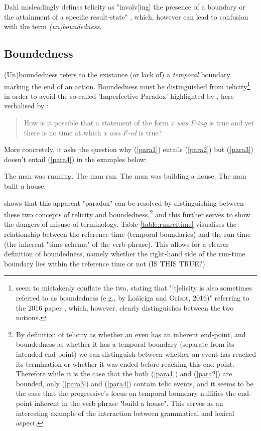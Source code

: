 Dahl misleadingly defines telicity as "involv[ing] the presence of a boundary or the attainment of a specific result-state" \citep{DAHL2015210}, which, however can lead to confusion with the term \emph{(un)boundedness}.
\subsection*{Boundedness}
(Un)boundedness refers to the existance (or lack of) a \emph{temporal} boundary marking the end of an action. Boundedness must be distinguished from telicity\footnote{\citet{friedrich-etal-2023-kind} seem to mistakenly conflate the two, stating that "[t]elicity is also sometimes referred to as boundedness (e.g., by Loáiciga and Grisot, 2016)" referring to the 2016 paper \citet{loaiciga-grisot-2016-predicting}, which, however, clearly distinguishes between the two notions.} in order to avoid the so-called 'Imperfective Paradox' highlighted by \citet{Linguistics2005DowtyD1}, here verbalised by \citet{zucchi}:

\begin{quotation}
    How is it possible that a statement of the form \emph{x was F-ing} is true and yet there
    is no time at which \emph{x was F-ed} is true?
\end{quotation}
More concretely, it asks the question why (\ref{para1}) entails (\ref{para2}) but (\ref{para3}) doesn't entail (\ref{para4}) in the examples below:
\begin{exe}
    \ex The man was running.
    \label{para1}
    \ex The man ran.
    \label{para2}
    \ex The man was building a house.
    \label{para3}
    \ex The man built a house.
    \label{para4}
\end{exe}
\citet{6608d9d0-a477-39af-8491-2172df5ae612} shows that this apparent "paradox" can be resolved by distinguishing between these two concepts of telicity and boundedness,\footnote{By definition of telicity as whether an even has an inherent end-point, and boundedness as whether it has a temporal boundary (separate from its intended end-point) we can distinguish between whether an event has reached its termination or whether it was ended before reaching this end-point. Therefore while it is the case that the both (\ref{para1}) and (\ref{para2}) are bounded, only (\ref{para3}) and (\ref{para4}) contain telic events, and it seems to be the case that the progressive's focus on temporal boundary nullifies the end-point inherent in the verb phrase "build a house". This serves as an interesting example of the interaction between grammatical and lexical aspect.} and this further serves to show the dangers of misuse of terminology. Table \ref{table:runreftime} visualises the relationship between the reference time (temporal boundaries) and the run-time (the inherent "time schema" of the verb phrase). This allows for a clearer definition of boundedness, namely whether the right-hand side of the run-time boundary lies within the reference time or not (IS THIS TRUE?).


